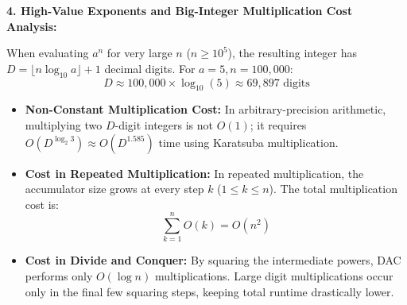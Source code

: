 \documentclass[12pt]{article}
\begin{document}
\begin{table}[H]
\centering
{}
\caption{Analytical Summary of Exponentiation Techniques}
\end{table}

\vspace{0.3cm}

\textbf{4. High-Value Exponents and Big-Integer Multiplication Cost Analysis:}

When evaluating $a^n$ for very large $n$ ($n \ge 10^5$), the resulting integer has $D = \lfloor n \log_{10} a \rfloor + 1$ decimal digits. For $a = 5, n = 100,000$:
\[
D \approx 100,000 \times \log_{10}(5) \approx 69,897 \text{ digits}
\]
\begin{itemize}
    \item \textbf{Non-Constant Multiplication Cost:} In arbitrary-precision arithmetic, multiplying two $D$-digit integers is not $O(1)$; it requires $O(D^{\log_2 3}) \approx O(D^{1.585})$ time using Karatsuba multiplication.
    \item \textbf{Cost in Repeated Multiplication:} In repeated multiplication, the accumulator size grows at every step $k$ ($1 \le k \le n$). The total multiplication cost is:
    \[
    \sum_{k=1}^n O(k) = O(n^2)
    \]
    \item \textbf{Cost in Divide and Conquer:} By squaring the intermediate powers, DAC performs only $O(\log n)$ multiplications. Large digit multiplications occur only in the final few squaring steps, keeping total runtime drastically lower.
\end{itemize}

\vspace{0.3cm}
\end{document}
